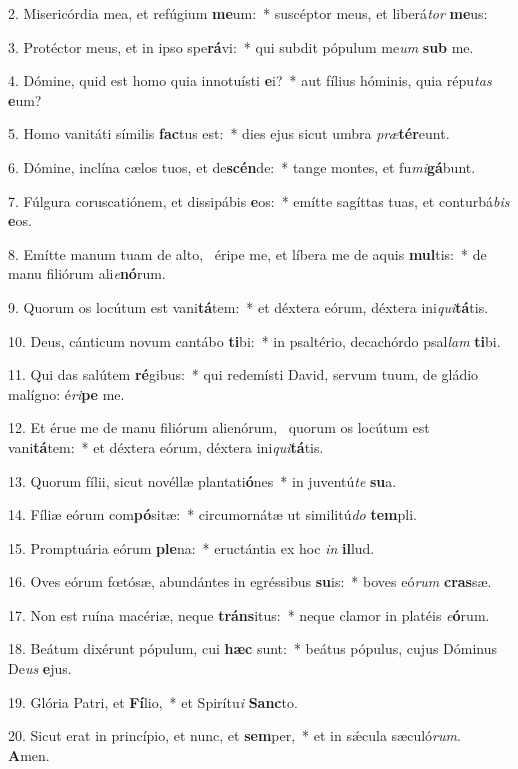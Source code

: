 2. Misericórdia mea, et refúgium \textbf{me}um:~*  suscéptor meus, et liberá\textit{tor} \textbf{me}us:\

3. Protéctor meus, et in ipso spe\textbf{rá}vi:~*  qui subdit pópulum me\textit{um} \textbf{sub} me.\

4. Dómine, quid est homo quia innotuísti \textbf{e}i?~*  aut fílius hóminis, quia répu\textit{tas} \textbf{e}um?\

5. Homo vanitáti símilis \textbf{fac}tus est:~*  dies ejus sicut umbra \textit{præ}\textbf{tér}eunt.\

6. Dómine, inclína cælos tuos, et de\textbf{scén}de:~*  tange montes, et fu\textit{mi}\textbf{gá}bunt.\

7. Fúlgura coruscatiónem, et dissipábis \textbf{e}os:~*  emítte sagíttas tuas, et conturbá\textit{bis} \textbf{e}os.\

8. Emítte manum tuam de alto, \dag\  éripe me, et líbera me de aquis \textbf{mul}tis:~*  de manu filiórum ali\textit{e}\textbf{nó}rum.\

9. Quorum os locútum est vani\textbf{tá}tem:~*  et déxtera eórum, déxtera ini\textit{qui}\textbf{tá}tis.\

10. Deus, cánticum novum cantábo \textbf{ti}bi:~*  in psaltério, decachórdo psal\textit{lam} \textbf{ti}bi.\

11. Qui das salútem \textbf{ré}gibus:~*  qui redemísti David, servum tuum, de gládio malígno: é\textit{ri}\textbf{pe} me.\

12. Et érue me de manu filiórum alienórum, \dag\  quorum os locútum est vani\textbf{tá}tem:~*  et déxtera eórum, déxtera ini\textit{qui}\textbf{tá}tis.\

13. Quorum fílii, sicut novéllæ plantati\textbf{ó}nes~*  in juventú\textit{te} \textbf{su}a.\

14. Fíliæ eórum com\textbf{pó}sitæ:~*  circumornátæ ut similitú\textit{do} \textbf{tem}pli.\

15. Promptuária eórum \textbf{ple}na:~*  eructántia ex hoc \textit{in} \textbf{il}lud.\

16. Oves eórum fœtósæ, abundántes in egréssibus \textbf{su}is:~*  boves eó\textit{rum} \textbf{cras}sæ.\

17. Non est ruína macériæ, neque \textbf{tráns}itus:~*  neque clamor in platéis \textit{e}\textbf{ó}rum.\

18. Beátum dixérunt pópulum, cui \textbf{hæc} sunt:~*  beátus pópulus, cujus Dóminus De\textit{us} \textbf{e}jus.\

19. Glória Patri, et \textbf{Fí}lio,~*  et Spirítu\textit{i} \textbf{Sanc}to.\

20. Sicut erat in princípio, et nunc, et \textbf{sem}per,~*  et in sǽcula sæculó\textit{rum}. \textbf{A}men.\

